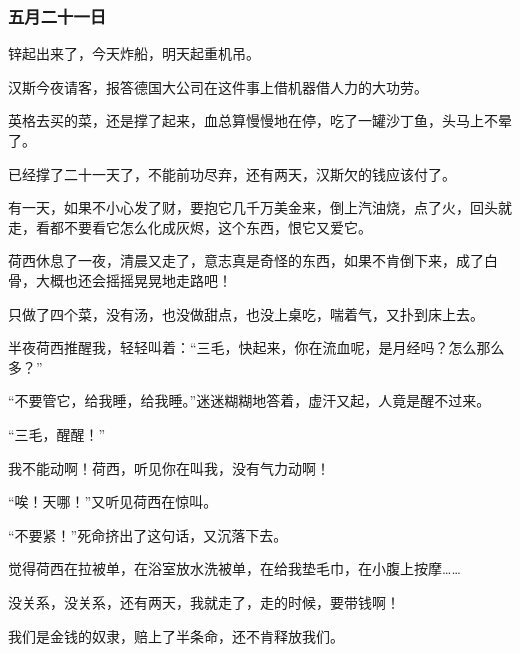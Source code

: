 \subsubsection{五月二十一日}
\par 锌起出来了，今天炸船，明天起重机吊。
\par 汉斯今夜请客，报答德国大公司在这件事上借机器借人力的大功劳。
\par 英格去买的菜，还是撑了起来，血总算慢慢地在停，吃了一罐沙丁鱼，头马上不晕了。
\par 已经撑了二十一天了，不能前功尽弃，还有两天，汉斯欠的钱应该付了。
\par 有一天，如果不小心发了财，要抱它几千万美金来，倒上汽油烧，点了火，回头就走，看都不要看它怎么化成灰烬，这个东西，恨它又爱它。
\par 荷西休息了一夜，清晨又走了，意志真是奇怪的东西，如果不肯倒下来，成了白骨，大概也还会摇摇晃晃地走路吧！
\par 只做了四个菜，没有汤，也没做甜点，也没上桌吃，喘着气，又扑到床上去。
\par 半夜荷西推醒我，轻轻叫着：“三毛，快起来，你在流血呢，是月经吗？怎么那么多？”
\par “不要管它，给我睡，给我睡。”迷迷糊糊地答着，虚汗又起，人竟是醒不过来。
\par “三毛，醒醒！”
\par 我不能动啊！荷西，听见你在叫我，没有气力动啊！
\par “唉！天哪！”又听见荷西在惊叫。
\par “不要紧！”死命挤出了这句话，又沉落下去。
\par 觉得荷西在拉被单，在浴室放水洗被单，在给我垫毛巾，在小腹上按摩……
\par 没关系，没关系，还有两天，我就走了，走的时候，要带钱啊！
\par 我们是金钱的奴隶，赔上了半条命，还不肯释放我们。


